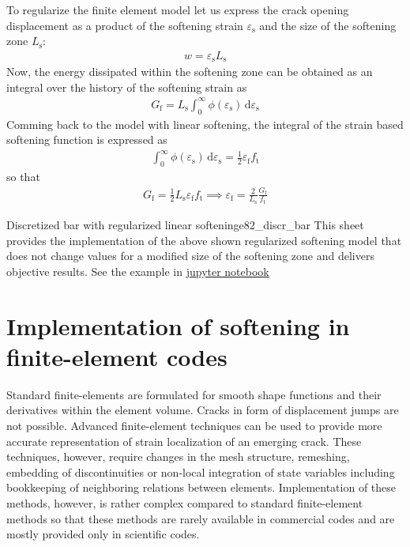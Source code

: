\documentclass[main.tex]{subfiles}
\begin{document}
To regularize the finite element model let us express the crack opening displacement as a product of the softening strain $\varepsilon_\mathrm{s}$ and the size of the softening zone $L_\mathrm{s}$:
\begin{align}
w = \varepsilon_\mathrm{s} L_\mathrm{s}
\end{align}
Now, the energy dissipated within the softening zone can be obtained as an integral over the history of the softening strain as
\begin{align}
G_\mathrm{f} = L_\mathrm{s} \int_0^{\infty} \phi(\varepsilon_\mathrm{s}) \, \mathrm{d}\varepsilon_\mathrm{s}
\end{align}
Comming back to the model with linear softening, the integral of the strain based softening function is expressed as
\begin{align}
\int_0^{\infty} \phi(\varepsilon_\mathrm{s})  \, \mathrm{d} \varepsilon_\mathrm{s} = \frac{1}{2} \varepsilon_\mathrm{f} f_\mathrm{t}
\end{align}
so that
\begin{align}
G_\mathrm{f} = \frac{1}{2} L_\mathrm{s} \varepsilon_\mathrm{f}
f_\mathrm{t}
\implies
\varepsilon_\mathrm{f} = \frac{2}{L_\mathrm{s}} \frac{G_\mathrm{f}}{ f_\mathrm{t}}
\end{align}

\begin{bmcsex}{Discretized bar with regularized linear softening}{e82_discr_bar}
This sheet provides the implementation of the above shown regularized softening model that does not change values for a modified size of the softening zone and delivers objective results.
See the example in \href{http://localhost:8888/tree/Examples/8.2 Regularized linear softening law for stable calculation in finite element code.ipynb}{jupyter notebook}
\end{bmcsex}

\section{Implementation of softening in finite-element codes}

Standard finite-elements are formulated for smooth shape functions and their derivatives within the element volume. Cracks in form of displacement jumps are not possible. Advanced finite-element techniques can be used to provide more accurate representation of strain localization of an emerging crack. These techniques, however, require changes in the mesh structure, remeshing, embedding of discontinuities or non-local integration of state variables including bookkeeping of neighboring relations between elements.  Implementation of these methods, however, is rather complex compared to standard finite-element methods so that these methods are rarely available in commercial codes and are mostly provided only in scientific codes.
 
\end{document}
